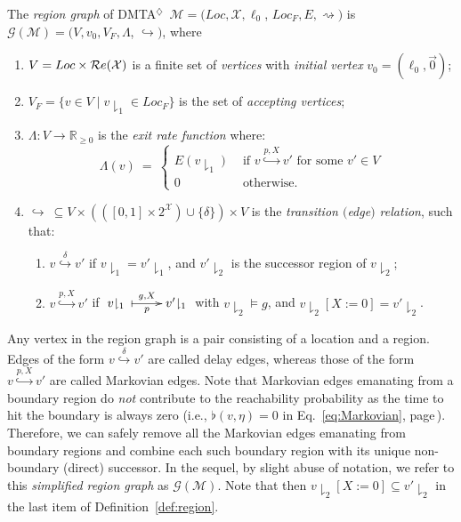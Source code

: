 \documentclass{LMCS}
\makeatletter
\newcommand{\mc}[1]{\mathcal{#1}}
\newcommand{\<}{\langle}
\renewcommand{\>}{\rangle}
\newcommand{\ges}{\geqslant}
\newcommand{\DMTAr}{\DMTA$^{\!\Ever}$}
\newcommand{\DMTA}{\textsc{DMTA}}
\newcommand{\F}{\mathop{\diamondsuit}}
\newcommand{\Reals}{\mathbb{R}}
\newcommand{\Ever}{\F}
\newcommand{\updownmapsto}[4]{\xymatrix{#1\;\ar @{|->}[r]^{#2}_{#3}&#4}}
\makeatother
\begin{document}
\begin{defi}[Region graph of \DMTAr]\label{def:region}
The \emph{region graph} of \DMTAr\ $\mc{M} = (Loc, \mc{X}, \ell_0$, $Loc_F,
E, \rightsquigarrow)$ is $\mc{G}(\mc{M}) = (V ,v_0, V_F, \Lambda$, $\hookrightarrow)$,
where
\begin{enumerate}[$\bullet$]
\item $V = Loc\times \mRe(\mc{X})$ is a finite set of \emph{vertices} with
  \emph{initial vertex} $v_0 = (\ell_0,\vec{0})$;

\item $V_F = \big\{v \in V \mid v{\downharpoonright_1}\in Loc_F\big\}$ is
the set of \emph{accepting vertices};

\item
${\Lambda:V\to \Reals_{\ges 0}}$ is the \emph{exit rate function} where:
$$
\Lambda(v) \ = \ \left\{  \begin{array}{ll}
E(v{\downharpoonright_1}) & \mbox{ if } v \stackrel{p,X}{\hookrightarrow}
v' \mbox{ for some } v' \in V \\[1ex]
0 & \mbox{ otherwise}.

\end{array} \right.
$$

\item $\hookrightarrow\ \subseteq V\times\left(\left([0,1]\times
2^\mc{X}\right)\cup\{\delta\}\right)\times V$ is the
\emph{transition $($edge$)$ relation}, such that:\begin{enumerate}[$\blacktriangleright$]
\item
$v\stackrel{\delta}{\hookrightarrow}v'$ if $v{\downharpoonright_1} = v'{\downharpoonright_1}$, and
$v'{\downharpoonright_2}$ is the successor region of $v{\downharpoonright_2}$;

\item
$v\stackrel{p,X}{\hookrightarrow}v'$ if $\updownmapsto{v{\downharpoonright_1}}{g,X}{p}{v'{\downharpoonright_1}}$ with $v{\downharpoonright_2} \models g$, and $v{\downharpoonright_2}[X:=0]= v'{\downharpoonright_2}$.
\end{enumerate}
\end{enumerate}
\end{defi}\medskip

\noindent Any vertex in the region graph is a pair consisting of a location and a region.
Edges of the form $v\stackrel{\delta}{\hookrightarrow}v'$ are called delay edges,
whereas those of the form $v\stackrel{p,X}{\hookrightarrow}v'$ are called Markovian
edges.   Note that Markovian edges emanating from a boundary region do \emph{not}
contribute to the reachability probability as the time to hit the boundary is always zero
(i.e., $\flat(v,\eta)=0$ in Eq.~\eqref{eq:Markovian}, page\,\pageref{eq:Markovian}).
Therefore, we can safely remove all the Markovian edges emanating from boundary
regions and combine each such boundary region with its unique non-boundary (direct)
successor.  In the sequel, by slight abuse of notation, we refer to this \emph{simplified region
graph} as $\mc{G}(\mc{M})$. Note that then
$v{\downharpoonright_2}[X:=0]\subseteq v'{\downharpoonright_2}$ in the last item of
Definition~\ref{def:region}.
\end{document}
